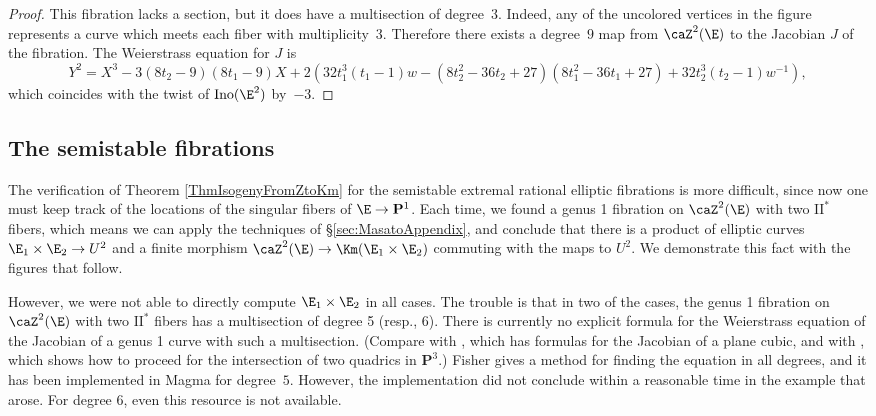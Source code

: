 \documentclass{article}
\def\P{\mathbf{P}}
\newcommand{\Ino}{\operatorname{{Ino}}}
\newcommand{\II}{\mathrm{II}}
\begin{document}
\begin{proof}
This fibration lacks a section, but it does have a multisection of degree~$3$.  Indeed, any of the uncolored vertices in the figure represents a curve which meets each fiber with multiplicity~$3$.  Therefore there exists a degree~$9$ map from $\caZ^2(\E)$ to the Jacobian $J$ of the fibration.  The Weierstrass equation for $J$ is\[
Y^2 = X^3 - 3  (8 t_{2} - 9) (8 t_{1} - 9)X 
+ 2 (32 t_{1}^3 (t_{1} - 1) w - (8 t_{2}^2 - 36 t_{2} + 27) (8 t_{1}^2 - 36 t_{1} + 27) + 32 t_{2}^3 (t_{2} - 1) w^{-1}),
\]
which coincides with the twist of $\Ino(\E^2)$ by~$-3$.%

\end{proof}

\subsection{The semistable fibrations}

The verification of Theorem \ref{ThmIsogenyFromZtoKm} for the semistable extremal rational elliptic fibrations is more difficult, since now one must keep track of the locations of the singular fibers of $\E\to\P^1$.  Each time, we found a genus 1 fibration on $\caZ^2(\E)$ with two $\II^\ast$ fibers, which means we can apply the techniques of \S\ref{sec:MasatoAppendix}, and conclude that there is a product of elliptic curves $\E_1\times \E_2\to U^2$ and a finite morphism $\caZ^2(\E)\to \Km(\E_1\times \E_2)$ commuting with the maps to $U^2$.  We demonstrate this fact with the figures that follow.

However, we were not able to directly compute $\E_1\times\E_2$ in all cases.  
The trouble is that in two of the cases, the genus 1 fibration on
$\caZ^2(\E)$ with two $\II^\ast$ fibers has a multisection of degree 5
(resp., 6).  There is currently no explicit formula for the Weierstrass
equation of the Jacobian of a genus 1 curve with such a multisection.
(Compare with \cite{Artin-et-al:Jacobian}, which has formulas
for the Jacobian of a plane cubic, and with \cite{akmmmp}, which shows
how to proceed for the intersection of two quadrics in $\P^3$.)
Fisher \cite{Fis18} gives a method for finding the equation in all degrees,
and it has
been implemented in Magma for degree~$5$.  However, the implementation
did not conclude
within a reasonable time in the example that arose.  For degree $6$, even
this resource is not available.
\end{document}
